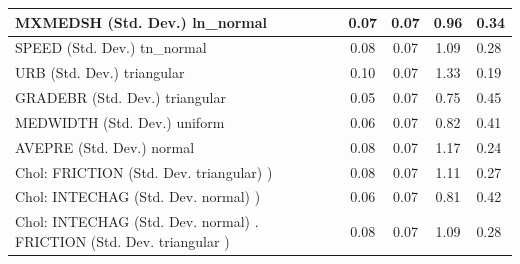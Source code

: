 \begin{table}
\begin{center}
\begin{tabular}{|l|l|c|c|c|l|}
			\hline
			MXMEDSH (Std. Dev.) ln_normal &  & 0.07 & 0.07 & 0.96 & 0.34 \\
			\hline
			SPEED (Std. Dev.) tn_normal &  & 0.08 & 0.07 & 1.09 & 0.28 \\
			\hline
			URB (Std. Dev.) triangular &  & 0.10 & 0.07 & 1.33 & 0.19 \\
			\hline
			GRADEBR (Std. Dev.) triangular &  & 0.05 & 0.07 & 0.75 & 0.45 \\
			\hline
			MEDWIDTH (Std. Dev.) uniform &  & 0.06 & 0.07 & 0.82 & 0.41 \\
			\hline
			AVEPRE (Std. Dev.) normal &  & 0.08 & 0.07 & 1.17 & 0.24 \\
			\hline
			 Chol: FRICTION (Std. Dev. triangular) ) &  & 0.08 & 0.07 & 1.11 & 0.27 \\
			\hline
			 Chol: INTECHAG (Std. Dev. normal) ) &  & 0.06 & 0.07 & 0.81 & 0.42 \\
			\hline
			 Chol: INTECHAG (Std. Dev. normal) . FRICTION (Std. Dev.   triangular ) &  & 0.08 & 0.07 & 1.09 & 0.28 \\
			\hline
		\end{tabular}
	\end{center}
\end{table}